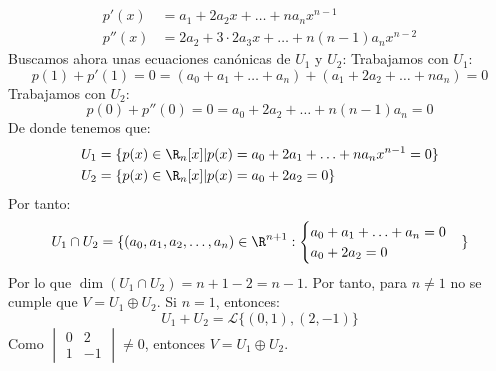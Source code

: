 \begin{ejercicio}
\begin{enumerate}
\begin{align*}
			      p'(x)  & = a_1 + 2a_2 x + \ldots + na_n x^{n-1}                \\
			      p''(x) & = 2a_2 + 3 \cdot 2 a_3 x + \ldots + n(n-1)a_n x^{n-2}
		      \end{align*}
		      Buscamos ahora unas ecuaciones canónicas de $U_1$ y $U_2$:
		      Trabajamos con $U_1$:
		      \begin{equation*}
			      p(1) + p'(1) = 0 = (a_0 + a_1 + \ldots + a_n) + (a_1 + 2a_2 + \ldots + na_n) = 0
		      \end{equation*}
		      Trabajamos con $U_2$:
		      \begin{equation*}
			      p(0) + p''(0) = 0 = a_0 + 2a_2 + \ldots + n(n-1)a_n = 0
		      \end{equation*}
		      De donde tenemos que:
		      \begin{align*}
			      U_1 & = \{p(x) \in \R_n[x] | p(x) = a_0 + 2a_1  + \ldots + na_n x^{n-1} = 0\}
			      \\ U_2 &= \{p(x) \in \R_n[x] | p(x) = a_0 + 2a_2 = 0\}
		      \end{align*}
		      Por tanto:
		      \begin{equation*}
			      U_1 \cap U_2 = \{ (a_0, a_1, a_2, \ldots, a_n) \in \R^{n+1} : \begin{cases}
				      a_0 + a_1 + \ldots + a_n = 0 \\
				      a_0 + 2a_2 = 0
			      \end{cases}
			      \}
		      \end{equation*}
		      Por lo que $ \dim(U_1 \cap U_2) = n + 1 - 2 = n - 1$. Por tanto, para $n \neq 1$ no se cumple que $V = U_1 \oplus U_2$.
		      Si $n = 1$, entonces:
		      \begin{equation*}
			      U_1 + U_2 = \mathcal{L}\{(0,1), (2,-1)\}
		      \end{equation*}
		      Como $\begin{vmatrix}
				      0 & 2  \\
				      1 & -1
			      \end{vmatrix} \neq 0$, entonces $V = U_1 \oplus U_2$.



\end{enumerate}
\end{ejercicio}
